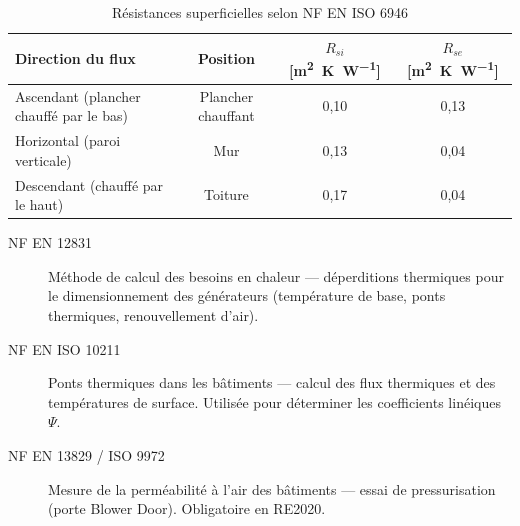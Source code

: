 \begin{table}[H]
  \centering
  \caption{Résistances superficielles selon NF EN ISO 6946}
  \begin{tabular}{lccc}
    \toprule
    Direction du flux & Position & \(R_{si}\) [\si{\meter\squared\kelvin\per\watt}]
                      & \(R_{se}\) [\si{\meter\squared\kelvin\per\watt}] \\
    \midrule
    Ascendant (plancher chauffé par le bas) & Plancher chauffant & 0,10 & 0,13 \\
    Horizontal (paroi verticale) & Mur & 0,13 & 0,04 \\
    Descendant (chauffé par le haut) & Toiture & 0,17 & 0,04 \\
    \bottomrule
  \end{tabular}
\end{table}

\begin{description}
  \item[NF EN 12831] Méthode de calcul des besoins en chaleur — déperditions thermiques pour le dimensionnement des générateurs (température de base, ponts thermiques, renouvellement d'air).
  \item[NF EN ISO 10211] Ponts thermiques dans les bâtiments — calcul des flux thermiques et des températures de surface. Utilisée pour déterminer les coefficients linéiques $\Psi$.
  \item[NF EN 13829 / ISO 9972] Mesure de la perméabilité à l'air des bâtiments — essai de pressurisation (porte Blower Door). Obligatoire en RE2020.
\end{description}

